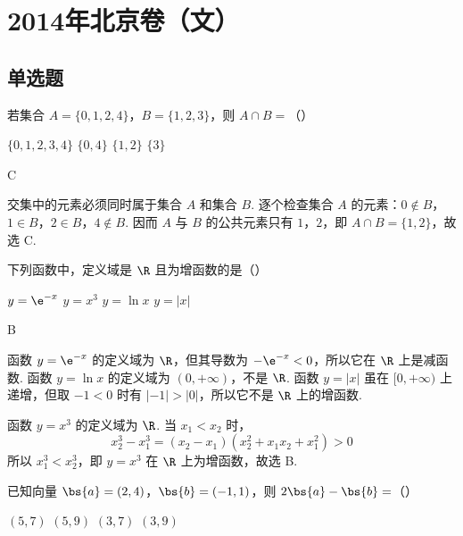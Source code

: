 \chapter{2014年北京卷（文）}

\section{单选题}

\begin{problem}
若集合 \(A = \{0, 1, 2, 4\}\)，\(B = \{1, 2, 3\}\)，则 \(A \cap B =\)（\quad）

\choices
    {\(\{0, 1, 2, 3, 4\}\)}
    {\(\{0, 4\}\)}
    {\(\{1, 2\}\)}
    {\(\{3\}\)}
\end{problem}

\begin{answer}
C
\end{answer}

\begin{solution}
交集中的元素必须同时属于集合 \(A\) 和集合 \(B\). 逐个检查集合 \(A\) 的元素：\(0\notin B\)，\(1\in B\)，\(2\in B\)，\(4\notin B\). 因而 \(A\) 与 \(B\) 的公共元素只有 \(1\)，\(2\)，即 \(A\cap B=\{1,2\}\)，故选 C.
\end{solution}

\begin{problem}
下列函数中，定义域是 \(\R\) 且为增函数的是（\quad）

\choices
    {\(y = \e^{-x}\)}
    {\(y = x^{3}\)}
    {\(y = \ln x\)}
    {\(y = |x|\)}
\end{problem}

\begin{answer}
B
\end{answer}

\begin{solution}
函数 \(y=\e^{-x}\) 的定义域为 \(\R\)，但其导数为 \(-\e^{-x}<0\)，所以它在 \(\R\) 上是减函数. 函数 \(y=\ln x\) 的定义域为 \((0,+\infty)\)，不是 \(\R\). 函数 \(y=|x|\) 虽在 \([0,+\infty)\) 上递增，但取 \(-1<0\) 时有 \(|-1|>|0|\)，所以它不是 \(\R\) 上的增函数.

函数 \(y=x^3\) 的定义域为 \(\R\). 当 \(x_1<x_2\) 时，
\[
x_2^3-x_1^3=(x_2-x_1)(x_2^2+x_1x_2+x_1^2)>0
\]
所以 \(x_1^3<x_2^3\)，即 \(y=x^3\) 在 \(\R\) 上为增函数，故选 B.
\end{solution}

\begin{problem}
已知向量 \(\bs{a} = (2, 4)\)，\(\bs{b} = (-1, 1)\)，则 \(2\bs{a} - \bs{b} =\)（\quad）

\choices
    {\((5,7)\)}
    {\((5,9)\)}
    {\((3,7)\)}
    {\((3,9)\)}
\end{problem}

